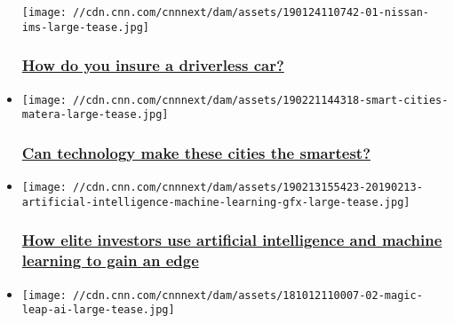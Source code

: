 \begin{itemize}
  \texttt{[image: //cdn.cnn.com/cnnnext/dam/assets/190124110742-01-nissan-ims-large-tease.jpg]}

  \hypertarget{how-do-you-insure-a-driverless-car-}{%
  \subsubsection{\texorpdfstring{\href{/2019/03/21/cars/driverless-cars-insurance-liability-explained/index.html}{How
  do you insure a driverless car?
  }}{How do you insure a driverless car? }}\label{how-do-you-insure-a-driverless-car-}}
\item
  \href{/2019/02/25/business/smart-cities-business-evolved/index.html}{}

  \texttt{[image: //cdn.cnn.com/cnnnext/dam/assets/190221144318-smart-cities-matera-large-tease.jpg]}

  \hypertarget{can-technology-make-these-cities-the-smartest-}{%
  \subsubsection{\texorpdfstring{\href{/2019/02/25/business/smart-cities-business-evolved/index.html}{Can
  technology make these cities the smartest?
  }}{Can technology make these cities the smartest? }}\label{can-technology-make-these-cities-the-smartest-}}
\item
  \href{/2019/02/17/investing/artificial-intelligence-investors-machine-learning/index.html}{}

  \texttt{[image: //cdn.cnn.com/cnnnext/dam/assets/190213155423-20190213-artificial-intelligence-machine-learning-gfx-large-tease.jpg]}

  \hypertarget{how-elite-investors-use-artificial-intelligence-and-machine-learning-to-gain-an-edge}{%
  \subsubsection{\texorpdfstring{\href{/2019/02/17/investing/artificial-intelligence-investors-machine-learning/index.html}{How
  elite investors use artificial intelligence and machine learning to
  gain an
  edge}}{How elite investors use artificial intelligence and machine learning to gain an edge}}\label{how-elite-investors-use-artificial-intelligence-and-machine-learning-to-gain-an-edge}}
\item
  \href{/2018/10/12/tech/magic-leap-ai-assistant/index.html}{}

  \texttt{[image: //cdn.cnn.com/cnnnext/dam/assets/181012110007-02-magic-leap-ai-large-tease.jpg]}


\end{itemize}
